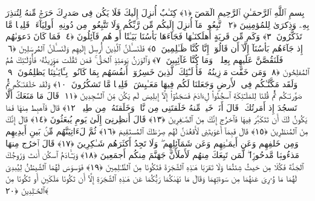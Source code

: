 
  
    
  
    
    

\nopagebreak
  بِسمِ ٱللَّهِ ٱلرَّحمَـٰنِ ٱلرَّحِيمِ
  الٓمٓصٓ ﴿١﴾
 كِتَـٰبٌ أُنزِلَ إِلَيكَ فَلَا يَكُن فِى صَدرِكَ حَرَجٌۭ مِّنهُ لِتُنذِرَ بِهِۦ وَذِكرَىٰ لِلمُؤمِنِينَ ﴿٢﴾
 ٱتَّبِعُوا۟ مَآ أُنزِلَ إِلَيكُم مِّن رَّبِّكُم وَلَا تَتَّبِعُوا۟ مِن دُونِهِۦٓ أَولِيَآءَ ۗ قَلِيلًۭا مَّا تَذَكَّرُونَ ﴿٣﴾
 وَكَم مِّن قَريَةٍ أَهلَكنَـٰهَا فَجَآءَهَا بَأسُنَا بَيَـٰتًا أَو هُم قَآئِلُونَ ﴿٤﴾
 فَمَا كَانَ دَعوَىٰهُم إِذ جَآءَهُم بَأسُنَآ إِلَّآ أَن قَالُوٓا۟ إِنَّا كُنَّا ظَـٰلِمِينَ ﴿٥﴾
 فَلَنَسـَٔلَنَّ ٱلَّذِينَ أُرسِلَ إِلَيهِم وَلَنَسـَٔلَنَّ ٱلمُرسَلِينَ ﴿٦﴾
 فَلَنَقُصَّنَّ عَلَيهِم بِعِلمٍۢ ۖ وَمَا كُنَّا غَآئِبِينَ ﴿٧﴾
 وَٱلوَزنُ يَومَئِذٍ ٱلحَقُّ ۚ فَمَن ثَقُلَت مَوَٟزِينُهُۥ فَأُو۟لَـٰٓئِكَ هُمُ ٱلمُفلِحُونَ ﴿٨﴾
 وَمَن خَفَّت مَوَٟزِينُهُۥ فَأُو۟لَـٰٓئِكَ ٱلَّذِينَ خَسِرُوٓا۟ أَنفُسَهُم بِمَا كَانُوا۟ بِـَٔايَـٰتِنَا يَظلِمُونَ ﴿٩﴾
 وَلَقَد مَكَّنَّـٰكُم فِى ٱلأَرضِ وَجَعَلنَا لَكُم فِيهَا مَعَـٰيِشَ ۗ قَلِيلًۭا مَّا تَشكُرُونَ ﴿١٠﴾
 وَلَقَد خَلَقنَـٰكُم ثُمَّ صَوَّرنَـٰكُم ثُمَّ قُلنَا لِلمَلَـٰٓئِكَةِ ٱسجُدُوا۟ لِءَادَمَ فَسَجَدُوٓا۟ إِلَّآ إِبلِيسَ لَم يَكُن مِّنَ ٱلسَّٰجِدِينَ ﴿١١﴾
 قَالَ مَا مَنَعَكَ أَلَّا تَسجُدَ إِذ أَمَرتُكَ ۖ قَالَ أَنَا۠ خَيرٌۭ مِّنهُ خَلَقتَنِى مِن نَّارٍۢ وَخَلَقتَهُۥ مِن طِينٍۢ ﴿١٢﴾
 قَالَ فَٱهبِط مِنهَا فَمَا يَكُونُ لَكَ أَن تَتَكَبَّرَ فِيهَا فَٱخرُج إِنَّكَ مِنَ ٱلصَّـٰغِرِينَ ﴿١٣﴾
 قَالَ أَنظِرنِىٓ إِلَىٰ يَومِ يُبعَثُونَ ﴿١٤﴾
 قَالَ إِنَّكَ مِنَ ٱلمُنظَرِينَ ﴿١٥﴾
 قَالَ فَبِمَآ أَغوَيتَنِى لَأَقعُدَنَّ لَهُم صِرَٰطَكَ ٱلمُستَقِيمَ ﴿١٦﴾
 ثُمَّ لَءَاتِيَنَّهُم مِّنۢ بَينِ أَيدِيهِم وَمِن خَلفِهِم وَعَن أَيمَـٰنِهِم وَعَن شَمَآئِلِهِم ۖ وَلَا تَجِدُ أَكثَرَهُم شَـٰكِرِينَ ﴿١٧﴾
 قَالَ ٱخرُج مِنهَا مَذءُومًۭا مَّدحُورًۭا ۖ لَّمَن تَبِعَكَ مِنهُم لَأَملَأَنَّ جَهَنَّمَ مِنكُم أَجمَعِينَ ﴿١٨﴾
 وَيَـٰٓـَٔادَمُ ٱسكُن أَنتَ وَزَوجُكَ ٱلجَنَّةَ فَكُلَا مِن حَيثُ شِئتُمَا وَلَا تَقرَبَا هَـٰذِهِ ٱلشَّجَرَةَ فَتَكُونَا مِنَ ٱلظَّـٰلِمِينَ ﴿١٩﴾
 فَوَسوَسَ لَهُمَا ٱلشَّيطَٰنُ لِيُبدِىَ لَهُمَا مَا وُۥرِىَ عَنهُمَا مِن سَوءَٰتِهِمَا وَقَالَ مَا نَهَىٰكُمَا رَبُّكُمَا عَن هَـٰذِهِ ٱلشَّجَرَةِ إِلَّآ أَن تَكُونَا مَلَكَينِ أَو تَكُونَا مِنَ ٱلخَـٰلِدِينَ ﴿٢٠﴾
